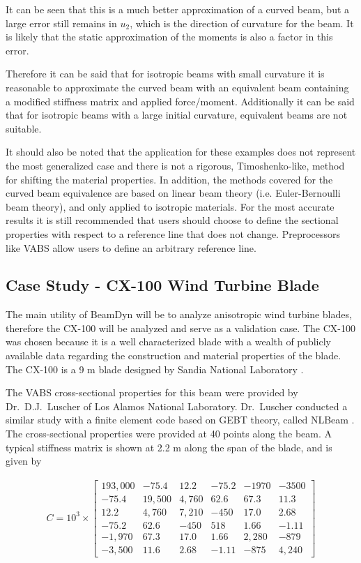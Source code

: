 \documentclass[letterpaper,12pt]{article}
\begin{document}
It can be seen that this is a much better approximation of a curved beam, but a large error still remains in $u_2$, which is the direction of curvature for the beam. It is likely that the static approximation of the moments is also a factor in this error. 

Therefore it can be said that for isotropic beams with small curvature it is reasonable to approximate the curved beam with an equivalent beam containing a modified stiffness matrix and applied force/moment. Additionally it can be said that for isotropic beams with a large initial curvature, equivalent beams are not suitable. 

It should also be noted that the application for these examples does not represent the most generalized case and there is not a rigorous, Timoshenko-like, method for shifting the material properties. In addition, the methods covered for the curved beam equivalence are based on linear beam theory (i.e. Euler-Bernoulli beam theory), and only applied to isotropic materials. For the most accurate results it is still recommended that users should choose to define the sectional properties with respect to a reference line that does not change. Preprocessors like VABS allow users to define an arbitrary reference line. 

\newpage

\subsection{Case Study - CX-100 Wind Turbine Blade}
\label{sec:cx}
The main utility of BeamDyn will be to analyze anisotropic wind turbine blades, therefore the CX-100 will be analyzed and serve as a validation case. The CX-100 was chosen because it is a well characterized blade with a wealth of publicly available data regarding the construction and material properties of the blade. The CX-100 is a 9 m blade designed by Sandia National Laboratory \cite{paquette2006modeling}.

The VABS cross-sectional properties for this beam were provided by Dr.\ D.J.\ Luscher of Los Alamos National Laboratory. Dr.\ Luscher conducted a similar study with a finite element code based on GEBT theory, called NLBeam \cite{Luscher:2013}. The cross-sectional properties were provided at 40 points along the beam. A typical stiffness matrix is shown at 2.2 m along the span of the blade, and is given by

\begin{align*}
C =10^3 \times \begin{bmatrix}
	193,000 & -75.4   & 12.2   & -75.2  & -1970    & -3500    \\
	-75.4  & 19,500 & 4,760   & 62.6  & 67.3    & 11.3    \\
	12.2  & 4,760   & 7,210 & -450  & 17.0    & 2.68    \\
	-75.2  & 62.6   & -450   & 518 & 1.66    & -1.11    \\
	-1,970  & 67.3   & 17.0   & 1.66  & 2,280 & -879    \\
	-3,500  & 11.6   & 2.68   & -1.11  & -875    & 4,240
\end{bmatrix}
\end{align*}
\end{document}
